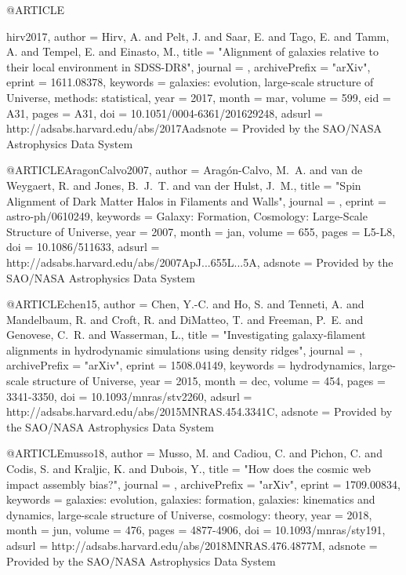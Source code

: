 \documentclass{aa}
\begin{document}
@ARTICLE{hirv2017,
   author = {{Hirv}, A. and {Pelt}, J. and {Saar}, E. and {Tago}, E. and 
	{Tamm}, A. and {Tempel}, E. and {Einasto}, M.},
    title = "{Alignment of galaxies relative to their local environment in SDSS-DR8}",
  journal = {\aap},
archivePrefix = "arXiv",
   eprint = {1611.08378},
 keywords = {galaxies: evolution, large-scale structure of Universe, methods: statistical},
     year = 2017,
    month = mar,
   volume = 599,
      eid = {A31},
    pages = {A31},
      doi = {10.1051/0004-6361/201629248},
   adsurl = {http://adsabs.harvard.edu/abs/2017Aadsnote = {Provided by the SAO/NASA Astrophysics Data System}
}


@ARTICLE{AragonCalvo2007,
   author = {{Arag{\'o}n-Calvo}, M.~A. and {van de Weygaert}, R. and {Jones}, B.~J.~T. and 
	{van der Hulst}, J.~M.},
    title = "{Spin Alignment of Dark Matter Halos in Filaments and Walls}",
  journal = {\apjl},
   eprint = {astro-ph/0610249},
 keywords = {Galaxy: Formation, Cosmology: Large-Scale Structure of Universe},
     year = 2007,
    month = jan,
   volume = 655,
    pages = {L5-L8},
      doi = {10.1086/511633},
   adsurl = {http://adsabs.harvard.edu/abs/2007ApJ...655L...5A},
  adsnote = {Provided by the SAO/NASA Astrophysics Data System}
}

@ARTICLE{chen15,
   author = {{Chen}, Y.-C. and {Ho}, S. and {Tenneti}, A. and {Mandelbaum}, R. and 
	{Croft}, R. and {DiMatteo}, T. and {Freeman}, P.~E. and {Genovese}, C.~R. and 
	{Wasserman}, L.},
    title = "{Investigating galaxy-filament alignments in hydrodynamic simulations using density ridges}",
  journal = {\mnras},
archivePrefix = "arXiv",
   eprint = {1508.04149},
 keywords = {hydrodynamics, large-scale structure of Universe},
     year = 2015,
    month = dec,
   volume = 454,
    pages = {3341-3350},
      doi = {10.1093/mnras/stv2260},
   adsurl = {http://adsabs.harvard.edu/abs/2015MNRAS.454.3341C},
  adsnote = {Provided by the SAO/NASA Astrophysics Data System}
}


@ARTICLE{musso18,
   author = {{Musso}, M. and {Cadiou}, C. and {Pichon}, C. and {Codis}, S. and 
	{Kraljic}, K. and {Dubois}, Y.},
    title = "{How does the cosmic web impact assembly bias?}",
  journal = {\mnras},
archivePrefix = "arXiv",
   eprint = {1709.00834},
 keywords = {galaxies: evolution, galaxies: formation, galaxies: kinematics and dynamics, large-scale structure of Universe, cosmology: theory},
     year = 2018,
    month = jun,
   volume = 476,
    pages = {4877-4906},
      doi = {10.1093/mnras/sty191},
   adsurl = {http://adsabs.harvard.edu/abs/2018MNRAS.476.4877M},
  adsnote = {Provided by the SAO/NASA Astrophysics Data System}
}


}
\end{document}
